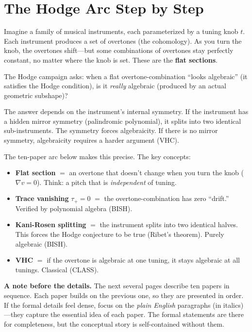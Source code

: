 \documentclass[11pt,twoside,openany]{report}
\theoremstyle{remark}
\newcommand{\BISH}{\textsf{BISH}}
\newcommand{\CLASS}{\textsf{CLASS}}
\begin{document}
\section{The Hodge Arc Step by Step}

\begin{analogybox}
Imagine a family of musical instruments, each parameterized by a tuning knob $t$. Each instrument produces a set of overtones (the cohomology). As you turn the knob, the overtones shift---but some combinations of overtones stay perfectly constant, no matter where the knob is set. These are the \textbf{flat sections}.

The Hodge campaign asks: when a flat overtone-combination ``looks algebraic'' (it satisfies the Hodge condition), is it \emph{really} algebraic (produced by an actual geometric subshape)?

The answer depends on the instrument's internal symmetry. If the instrument has a hidden mirror symmetry (palindromic polynomial), it splits into two identical sub-instruments. The symmetry forces algebraicity. If there is no mirror symmetry, algebraicity requires a harder argument (VHC).

The ten-paper arc below makes this precise. The key concepts:
\begin{itemize}
  \item \textbf{Flat section} $=$ an overtone that doesn't change when you turn the knob ($\nabla v = 0$). Think: a pitch that is \emph{independent} of tuning.
  \item \textbf{Trace vanishing} $\tau_+ = 0$ $=$ the overtone-combination has zero ``drift.'' Verified by polynomial algebra (\BISH).
  \item \textbf{Kani-Rosen splitting} $=$ the instrument splits into two identical halves. This forces the Hodge conjecture to be true (Ribet's theorem). Purely algebraic (\BISH).
  \item \textbf{VHC} $=$ if the overtone is algebraic at one tuning, it stays algebraic at all tunings. Classical (\CLASS).
\end{itemize}
\end{analogybox}

\textbf{A note before the details.} The next several pages describe ten papers in sequence. Each paper builds on the previous one, so they are presented in order. If the formal details feel dense, focus on the \emph{plain English} paragraphs (in italics)---they capture the essential idea of each paper. The formal statements are there for completeness, but the conceptual story is self-contained without them.
\end{document}
